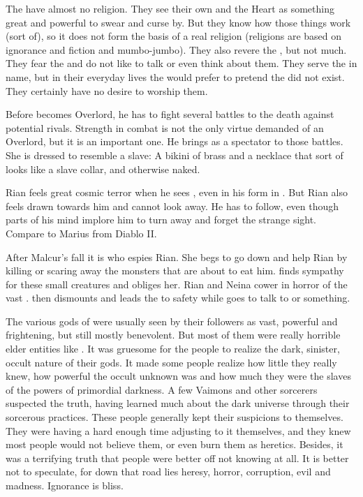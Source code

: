 The \resphain have almost no religion.
They see their own \matrices and the Heart as something great and powerful to swear and curse by. But they know how those things work (sort of), so it does not form the basis of a real religion (religions are based on ignorance and fiction and mumbo-jumbo). 
They also revere the \banelords, but not much.
They fear the \banes and do not like to talk or even think about them. 
They serve the \banelords in name, but in their everyday lives the \resphain would prefer to pretend the \banelords did not exist.
They certainly have no desire to worship them.

Before \Dasteron becomes Overlord, he has to fight several battles to the death against potential rivals.
Strength in combat is not the only virtue demanded of an Overlord, but it is an important one.
He brings \Cishiel as a spectator to those battles. 
She is dressed to resemble a slave: A bikini of brass and a necklace that sort of looks like a slave collar, and otherwise naked.

Rian feels great cosmic terror when he sees \Ishnaruchaefir, even in his \Scathaese form in \WanderersInDarknessEmph. 
But Rian also feels drawn towards him and cannot look away.
He has to follow, even though parts of his mind implore him to turn away and forget the strange sight.
Compare to Marius from Diablo II.

After Malcur's fall it is \Criseis who espies Rian.
She begs \Ishnaruchaefir to go down and help Rian by killing or scaring away the monsters that are about to eat him.
\Ishnaruchaefir finds sympathy for these small creatures and obliges her.
Rian and Neina cower in horror of the vast \dragon.
\Criseis then dismounts and leads the \humans to safety while \Ishnaruchaefir goes to talk to \Nzessuacrith or something.

The various gods of \Azmith were usually seen by their followers as vast, powerful and frightening, but still mostly benevolent.
But most of them were really horrible elder entities like \dragons. 
It was gruesome for the people to realize the dark, sinister, occult nature of their gods.
It made some people realize how little they really knew, how powerful the occult unknown was and how much they were the slaves of the powers of primordial darkness.
A few Vaimons and other sorcerers suspected the truth, having learned much about the dark universe through their sorcerous practices.
These people generally kept their suspicions to themselves.
They were having a hard enough time adjusting to it themselves, and they knew most people would not believe them, or even burn them as heretics. 
Besides, it was a terrifying truth that people were better off not knowing at all.
It is better not to speculate, for down that road lies heresy, horror, corruption, evil and madness.
Ignorance is bliss.

